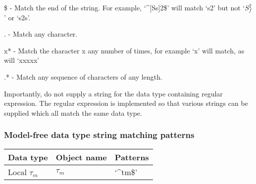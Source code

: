     \$ - Match the end of the string.  For example, `\^{}[Ss]2\$' will match `s2' but not `$S^2_f$'
    or `s2s'.

    . - Match any character.

    x* - Match the character x any number of times, for example `x' will match, as will
    `xxxxx'

    .* - Match any sequence of characters of any length.

Importantly, do not supply a string for the data type containing regular expression.  The
regular expression is implemented so that various strings can be supplied which all match
the same data type.


\subsubsection{Model-free data type string matching patterns}



\begin{center}
\begin{tabular}{lll}
\toprule
Data type & Object name & Patterns \\
\midrule
 Local $\tau_m$                &  $\tau_m$            &  `\^{}tm\$'                                            \\
\bottomrule
\end{tabular}
\end{center}

